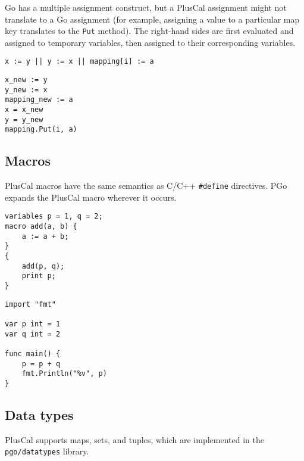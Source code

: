 Go has a multiple assignment construct, but a PlusCal assignment might not translate to a Go assignment (for example, assigning a value to a particular map key translates to the \texttt{Put} method). The right-hand sides are first evaluated and assigned to temporary variables, then assigned to their corresponding variables.

\noindent
\begin{minipage}[t]{0.45\textwidth}
\begin{lstlisting}[language=pcal]
x := y || y := x || mapping[i] := a
\end{lstlisting}
\end{minipage}
\hfill
\begin{minipage}[t]{0.45\textwidth}
\begin{lstlisting}[language=golang]
x_new := y
y_new := x
mapping_new := a
x = x_new
y = y_new
mapping.Put(i, a)
\end{lstlisting}
\end{minipage}

\subsection{Macros}
PlusCal macros have the same semantics as C/C++ \texttt{\#define} directives. PGo expands the PlusCal macro wherever it occurs.

\noindent
\begin{minipage}[t]{0.45\textwidth}
\begin{lstlisting}[language=pcal]
variables p = 1, q = 2;
macro add(a, b) {
	a := a + b;
}
{
	add(p, q);
	print p;
}
\end{lstlisting}
\end{minipage}
\hfill
\begin{minipage}[t]{0.45\textwidth}
\begin{lstlisting}[language=golang]
import "fmt"

var p int = 1
var q int = 2

func main() {
	p = p + q
	fmt.Println("%v", p)
}
\end{lstlisting}
\end{minipage}

\subsection{Data types}
PlusCal supports maps, sets, and tuples, which are implemented in the \texttt{pgo/datatypes} library.
